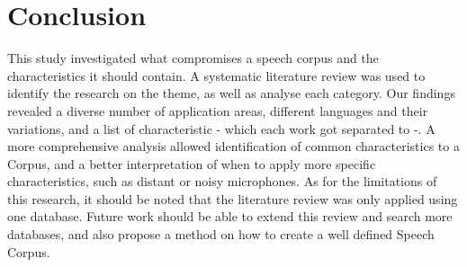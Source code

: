\documentclass[conference]{IEEEtran}
\begin{document}
\section{Conclusion}

This study investigated what compromises a speech corpus and the characteristics it should contain. A systematic literature review was used to identify the research on the theme, as well as analyse each category. Our findings revealed a diverse number of application areas, different languages and their variations, and a list of characteristic - which each work got separated to -. A more comprehensive analysis allowed identification of common characteristics to a Corpus, and a better interpretation of when to apply more specific characteristics, such as distant or noisy microphones. As for the limitations of this research, it should be noted that the literature review was only applied using one database. Future work should be able to extend this review and search more databases, and also propose a method on how to create a well defined Speech Corpus.



\end{document}
